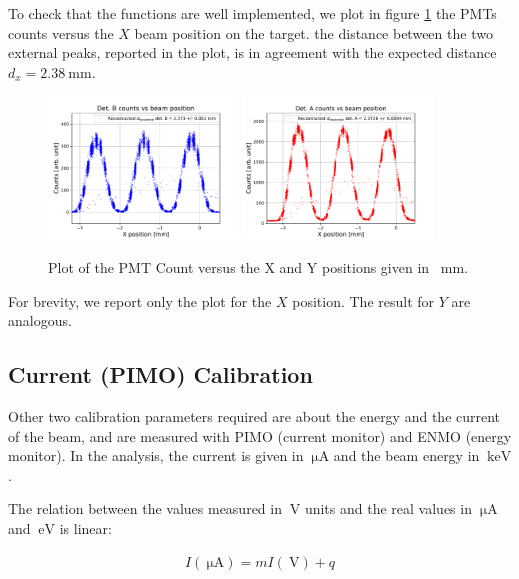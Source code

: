 To check that the functions are well implemented, we plot in figure \ref{fig:CheckHori} the PMTs counts versus the $X$ beam position on the target. the distance between the two external peaks, reported in the plot, is in agreement with the expected distance $d_{x}  = \SI{2.38}{\milli \meter}$.
 
\begin{figure}[hbtp]
\centering
\includegraphics[width=0.45\textwidth]{Analysis/XcheckB.pdf} 
\includegraphics[width=0.45\textwidth]{Analysis/XcheckA.pdf}
\caption{Plot of the PMT Count versus the X and Y positions given in \SI{}{\milli \meter}.}
\label{fig:CheckHori}
\end{figure}

For brevity, we report only the plot for the $X$ position. The result for $Y$ are analogous.

\subsection{Current (PIMO) Calibration} \label{CurrentCalibration}

Other two calibration parameters required are about the energy and the current of the beam, and are measured with PIMO (current monitor) and ENMO (energy monitor).  In the analysis, the current is given in $\SI{}{\micro \ampere}$ and the beam energy in $\SI{}{\kilo \electronvolt}$.

The relation between the values measured in $\SI{}{\volt}$ units and the real values in $\SI{}{\micro \ampere}$ and $\SI{}{\electronvolt}$ is linear:

\begin{align*}
I(\SI{}{\micro \ampere}) = m I(\SI{}{\volt}) + q
\end{align*}

